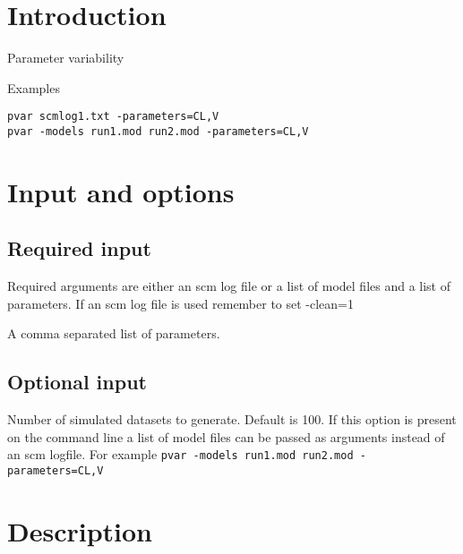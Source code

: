 



\maketitle


\section{Introduction}
Parameter variability

Examples
\begin{verbatim}
pvar scmlog1.txt -parameters=CL,V
pvar -models run1.mod run2.mod -parameters=CL,V
\end{verbatim}

\section{Input and options}

\subsection{Required input}
Required arguments are either an scm log file or a list of model files and a list of parameters. If an scm log file is used remember to set -clean=1

\begin{optionlist}

A comma separated list of parameters.
\nextopt
\end{optionlist}

\subsection{Optional input}

\begin{optionlist}
Number of simulated datasets to generate. Default is 100.
\nextopt
{}
If this option is present on the command line a list of model files can be passed as arguments instead of an scm logfile. For example \verb|pvar -models run1.mod run2.mod -parameters=CL,V|
\end{optionlist}

\section{Description}

